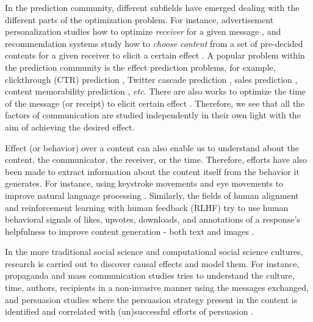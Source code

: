\documentclass[hidelinks,11pt,a4paper]{report}
\renewcommand{\cite}[1]{\citep{#1}}
\begin{document}
In the prediction community, different subfields have emerged dealing with the different parts of the optimization problem. For instance, advertisement personalization studies how to optimize \textit{receiver} for a given message \cite{XXX}, and recommendation systems study how to \textit{choose content} from a set of pre-decided contents for a given receiver to elicit a certain effect \cite{XXX}. A popular problem within the prediction community is the effect prediction problems, for example, clickthrough (CTR) prediction \cite{XXX}, Twitter cascade prediction \cite{cheng2014can,martin2016exploring}, sales prediction \cite{choi2012predicting,pryzant2017predicting}, content memorability prediction \cite{isola2011makes,khosla2015understanding,si2023long}, \textit{etc}. There are also works to optimize the time of the message (or receipt) to elicit certain effect \cite{XXX}. Therefore, we see that all the factors of communication are studied independently in their own light with the aim of achieving the desired effect. 


Effect (or behavior) over a content can also enable us to understand about the content, the communicator, the receiver, or the time. Therefore, efforts have also been made to extract information about the content itself from the behavior it generates. For instance, using keystroke movements \cite{plank2016keystroke} and eye movements to improve natural language processing \cite{klerke2016improving,khurana-etal-2023-synthesizing}. Similarly, the fields of human alignment and reinforcement learning with human feedback (RLHF) try to use human behavioral signals of likes, upvotes, downloads, and annotations of a response's helpfulness to improve content generation - both text \cite{kreutzer2018can,stiennon2020learning,ziegler2019fine,nakano2021webgpt,si2023long} and images \cite{lee2023aligning,pressman2023simulacra,wu2023better,khurana2023behavior}.


In the more traditional social science and computational social science cultures, research is carried out to discover causal effects and model them. 
For instance, propaganda and mass communication studies \cite{XXX} tries to understand the culture, time, authors, recipients in a non-invasive manner using the messages exchanged, and persuasion studies where the persuasion strategy present in the content is identified and correlated with (un)successful efforts of persuasion \cite{XXX}. 
\end{document}

